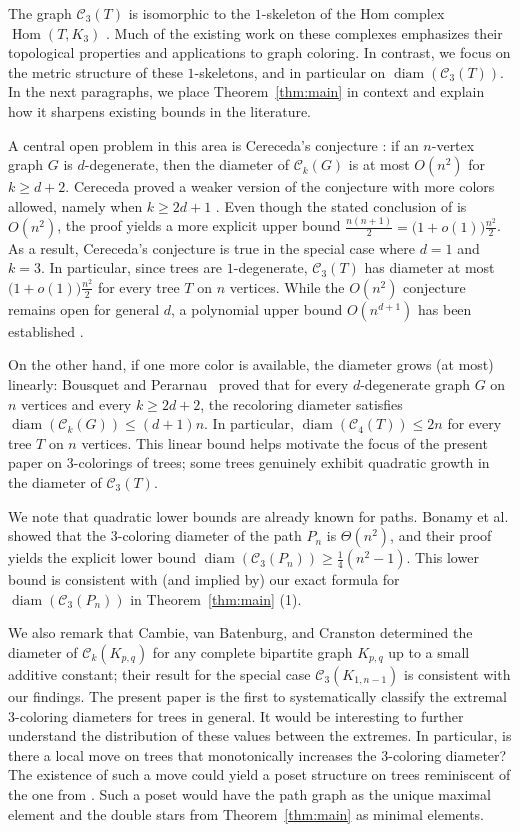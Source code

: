 \documentclass[12pt,reqno]{amsart}
\theoremstyle{definition}
\newcommand{\C}{\mathcal{C}}
\newcommand{\diam}{\operatorname{diam}}
\begin{document}
The graph $\C_3(T)$ is isomorphic to the $1$-skeleton of the Hom complex $\operatorname{Hom}(T,K_3)$ \cite{Koz08}. Much of the existing work on these complexes emphasizes their topological properties and applications to graph coloring. In contrast, we focus on the metric structure of these $1$-skeletons, and in particular on $\diam(\C_3(T))$. In the next paragraphs, we place Theorem~\ref{thm:main} in context and explain how it sharpens existing bounds in the literature.

A central open problem in this area is Cereceda's conjecture \cite{Cer07}: if an $n$-vertex graph $G$ is $d$-degenerate, then the diameter of $\C_k(G)$ is at most $O(n^2)$ for $k\geq d+2$. Cereceda proved a weaker version of the conjecture with more colors allowed, namely when $k\ge 2d+1$ \cite[Theorem~5.22]{Cer07}. Even though the stated conclusion of \cite[Theorem~5.22]{Cer07} is $O(n^2)$, the proof yields a more explicit upper bound $\frac{n(n+1)}{2} = \bigl(1+o(1)\bigr)\frac{n^2}{2}$. As a result, Cereceda's conjecture is true in the special case where $d=1$ and $k=3$. In particular, since trees are $1$-degenerate, $\C_3(T)$ has diameter at most $\bigl(1+o(1)\bigr)\frac{n^2}{2}$ for every tree $T$ on $n$ vertices. While the $O(n^2)$ conjecture remains open for general $d$, a polynomial upper bound $O(n^{d+1})$ has been established \cite{BH22}.

On the other hand, if one more color is available, the diameter grows (at most) linearly: Bousquet and Perarnau~\cite{BP16} proved that for every $d$-degenerate graph $G$ on $n$ vertices and every $k\ge 2d+2$, the recoloring diameter satisfies $\diam(\C_k(G))\le (d+1)n$. In particular, $\diam(\C_4(T))\leq 2n$ for every tree $T$ on $n$ vertices. This linear bound helps motivate the focus of the present paper on 3-colorings of trees; some trees genuinely exhibit quadratic growth in the diameter of $\C_3(T)$.

We note that quadratic lower bounds are already known for paths. Bonamy et al. \cite[Theorem~11]{BJLPP14} showed that the 3-coloring diameter of the path $P_n$ is $\Theta(n^2)$, and their proof yields the explicit lower bound $\diam(\C_3(P_n)) \ge \frac{1}{4}(n^2-1)$. This lower bound is consistent with (and implied by) our exact formula for $\diam(\C_3(P_n))$ in Theorem~\ref{thm:main} (1).

We also remark that Cambie, van Batenburg, and Cranston \cite{CvBC24} determined the diameter of $\C_k(K_{p,q})$ for any complete bipartite graph $K_{p,q}$ up to a small additive constant; their result for the special case $\C_{3}(K_{1,n-1})$ is consistent with our findings. The present paper is the first to systematically classify the extremal 3-coloring diameters for trees in general. It would be interesting to further understand the distribution of these values between the extremes. In particular, is there a local move on trees that monotonically increases the 3-coloring diameter? The existence of such a move could yield a poset structure on trees reminiscent of the one from \cite{CL15}. Such a poset would have the path graph as the unique maximal element and the double stars from Theorem~\ref{thm:main} as minimal elements.
\end{document}
